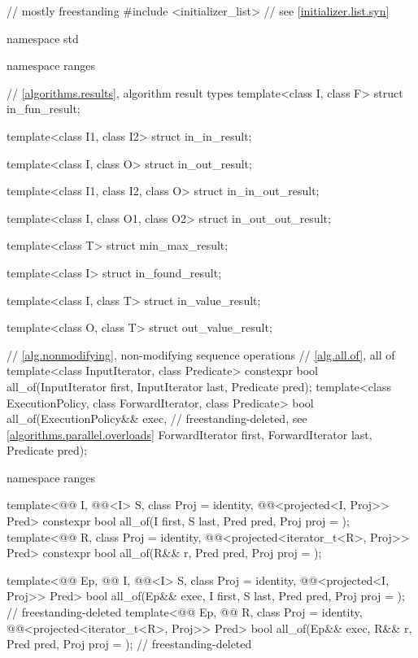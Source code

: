 \begin{codeblock}
// mostly freestanding
#include <initializer_list>     // see \ref{initializer.list.syn}

namespace std {
  namespace ranges {
    // \ref{algorithms.results}, algorithm result types
    template<class I, class F>
      struct in_fun_result;

    template<class I1, class I2>
      struct in_in_result;

    template<class I, class O>
      struct in_out_result;

    template<class I1, class I2, class O>
      struct in_in_out_result;

    template<class I, class O1, class O2>
      struct in_out_out_result;

    template<class T>
      struct min_max_result;

    template<class I>
      struct in_found_result;

    template<class I, class T>
      struct in_value_result;

    template<class O, class T>
      struct out_value_result;
  }

  // \ref{alg.nonmodifying}, non-modifying sequence operations
  // \ref{alg.all.of}, all of
  template<class InputIterator, class Predicate>
    constexpr bool all_of(InputIterator first, InputIterator last, Predicate pred);
  template<class ExecutionPolicy, class ForwardIterator, class Predicate>
    bool all_of(ExecutionPolicy&& exec,                         // freestanding-deleted, see \ref{algorithms.parallel.overloads}
                ForwardIterator first, ForwardIterator last, Predicate pred);

  namespace ranges {
    template<@@ I, @@<I> S, class Proj = identity,
             @@<projected<I, Proj>> Pred>
      constexpr bool all_of(I first, S last, Pred pred, Proj proj = {});
    template<@@ R, class Proj = identity,
             @@<projected<iterator_t<R>, Proj>> Pred>
      constexpr bool all_of(R&& r, Pred pred, Proj proj = {});

    template<@@ Ep, @@ I, @@<I> S,
             class Proj = identity, @@<projected<I, Proj>> Pred>
      bool all_of(Ep&& exec, I first, S last, Pred pred, Proj proj = {});   // freestanding-deleted
    template<@@ Ep, @@ R, class Proj = identity,
             @@<projected<iterator_t<R>, Proj>> Pred>
      bool all_of(Ep&& exec, R&& r, Pred pred, Proj proj = {});             // freestanding-deleted
  }

}
\end{codeblock}
